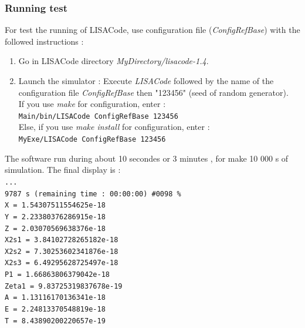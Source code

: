 \documentclass[a4paper,english,12pt]{article}
\begin{document}
\subsubsection{Running test}
\label{SSSTestFonctUNIX}
For test the running of LISACode, use configuration file ({\it ConfigRefBase}) with the followed instructions : \\
\begin{enumerate}
\item Go in LISACode directory {\it MyDirectory/lisacode-1.4}.
\item Launch the simulator : Execute {\it LISACode} followed by the name of the configuration file  {\it ConfigRefBase} then  "123456" (seed of random generator). \\
If you use {\it make} for configuration, enter : \\
\hphantom{aaaaa}\texttt{Main/bin/LISACode ConfigRefBase 123456} \\
Else, if you use {\it make install} for configuration, enter : \\
\hphantom{aaaaa}\texttt{MyExe/LISACode ConfigRefBase 123456}
\end{enumerate}
The software run during about 10 secondes or 3 minutes , for make 10 000 s of simulation. The final display is : \\
\texttt{...}\\
\texttt{9787 s    (remaining time : 00:00:00) \#0098 \%} \\
\hphantom{a}\texttt{X = 1.54307511554625e-18} \\
\hphantom{a}\texttt{Y = 2.23380376286915e-18} \\
\hphantom{a}\texttt{Z = 2.03070569638376e-18} \\
\hphantom{a}\texttt{X2s1 = 3.84102728265182e-18} \\
\hphantom{a}\texttt{X2s2 = 7.30253602341876e-18} \\
\hphantom{a}\texttt{X2s3 = 6.49295628725497e-18} \\
\hphantom{a}\texttt{P1 = 1.66863806379042e-18} \\
\hphantom{a}\texttt{Zeta1 = 9.83725319837678e-19} \\
\hphantom{a}\texttt{A = 1.13116170136341e-18} \\
\hphantom{a}\texttt{E = 2.24813370548819e-18} \\
\hphantom{a}\texttt{T = 8.43890200220657e-19}\\
\end{document}
